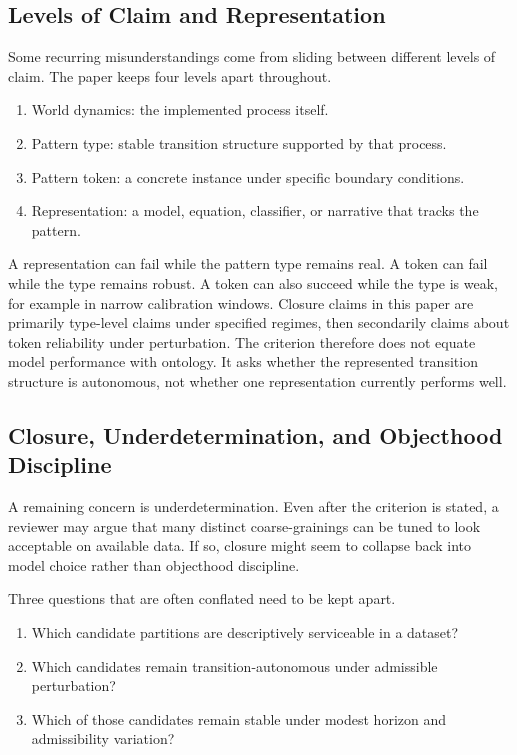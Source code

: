 \subsection{Levels of Claim and
	Representation}\label{levels-of-claim-and-representation}

Some recurring misunderstandings come from sliding between different
levels of claim. The paper keeps four levels apart throughout.

\begin{enumerate}
	\item
	      World dynamics: the implemented process itself.
	\item
	      Pattern type: stable transition structure supported by that process.
	\item
	      Pattern token: a concrete instance under specific boundary conditions.
	\item
	      Representation: a model, equation, classifier, or narrative that
	      tracks the pattern.
\end{enumerate}

A representation can fail while the pattern type remains real. A token
can fail while the type remains robust. A token can also succeed while
the type is weak, for example in narrow calibration windows. Closure
claims in this paper are primarily type-level claims under specified
regimes, then secondarily claims about token reliability under
perturbation. The criterion therefore does not equate model performance
with ontology. It asks whether the represented transition structure is
autonomous, not whether one representation currently performs well.

\subsection{Closure, Underdetermination, and Objecthood
	Discipline}\label{closure-underdetermination-and-objecthood-discipline}

A remaining concern is underdetermination. Even after the criterion is
stated, a reviewer may argue that many distinct coarse-grainings can be
tuned to look acceptable on available data. If so, closure might seem to
collapse back into model choice rather than objecthood discipline.

Three questions that are often conflated need to be kept apart.

\begin{enumerate}
	\item
	      Which candidate partitions are descriptively serviceable in a dataset?
	\item
	      Which candidates remain transition-autonomous under admissible
	      perturbation?
	\item
	      Which of those candidates remain stable under modest horizon and
	      admissibility variation?
\end{enumerate}

